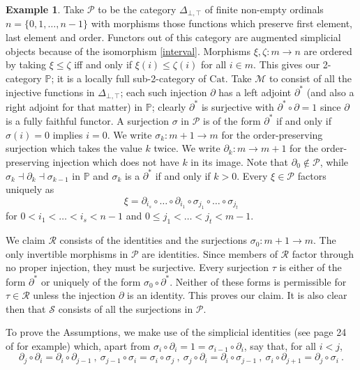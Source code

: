 \documentclass[a4paper,12pt,reqno]{amsart}
\theoremstyle{definition}
\newtheorem{example}[theorem]{Example}
\theoremstyle{fact}
\theoremstyle{genquest}
\theoremstyle{step}
\newcommand{\ra}{\rightarrow}
\def\CM{{\mathscr M}}
\def\CP{{\mathscr P}}
\def\CR{{\mathscr R}}
\def\CS{{\mathscr S}}
\begin{document}
\begin{example}\label{Ex2+}
Take $\CP$ to be the category $\Delta_{\bot,\top}$ of finite
non-empty ordinals $n = \{0,1,\dots,n-1\}$ with morphisms those functions which preserve
first element, last element and order.
Functors out of this category are augmented simplicial objects because of the isomorphism \eqref{interval}. 
Morphisms $\xi, \zeta : m\ra n$ are ordered by taking $\xi \le \zeta$ iff and only if 
$\xi(i) \le \zeta(i)$ for all $i\in m$. This gives our 2-category $\mathbb{P}$;
it is a locally full sub-2-category of $\mathrm{Cat}$. 
Take $\CM$ to consist of all the injective functions in $\Delta_{\bot,\top}$;
each such injection $\partial$ has a left adjoint $\partial^*$ 
(and also a right adjoint for that matter) in $\mathbb{P}$; clearly $\partial^*$ is
surjective with $\partial^* \circ \partial = 1$ since $\partial$ is a fully faithful functor.
A surjection $\sigma$ in $\CP$ is of the form $\partial^*$ if and only if $\sigma(i)=0$
implies $i=0$.    
We write $\sigma_k : m+1 \ra m$ for the order-preserving surjection which takes the value $k$ twice.
We write $\partial_k : m \ra m+1$ for the order-preserving injection which does not have $k$ in its image. 
Note that $\partial_0\notin \CP$, while $\sigma_k \dashv \partial_k  \dashv \sigma_{k-1}$ 
in $\mathbb{P}$ and $\sigma_k$ is a $\partial^*$ if and only if $k>0$.
Every $\xi \in \CP$ factors uniquely as 
$$\xi = \partial_{i_s}\circ \dots \circ \partial_{i_1}\circ \sigma_{j_1}\circ \dots \circ \sigma_{j_t}$$ 
for $0< i_1<\dots < i_s < n-1$ and $0\le j_1<\dots < j_t < m-1$. 

We claim $\CR$ consists of the identities and the surjections $\sigma_0 : m+1 \ra m$.
The only invertible morphisms in $\CP$ are identities.
Since members of $\CR$ factor through no proper injection, they must be surjective.
Every surjection $\tau$ is either of the form $\partial^*$ or uniquely of the form 
$\sigma_0\circ \partial^*$. 
Neither of these forms is permissible for $\tau \in \CR$ unless the injection $\partial$
is an identity. This proves our claim. 
It is also clear then that $\CS$ consists of all the surjections in $\CP$. 

To prove the Assumptions, we make use of the simplicial identities 
(see page 24 of \cite{GabZis} for example) which, 
apart from $\sigma_i\circ \partial_i = 1 = \sigma_{i-1}\circ \partial_i$,
say that, for all $i<j$, 
$$\partial_j\circ \partial_i = \partial_i \circ \partial_{j-1} \ , \ \sigma_{j-1}\circ \sigma_i = \sigma_i \circ \sigma_j \ , \ \sigma_{j}\circ \partial_i = \partial_i \circ \sigma_{j-1} \ , \ \sigma_{i}\circ \partial_{j+1} = \partial_j \circ \sigma_i \ .$$


\end{example}
\end{document}
